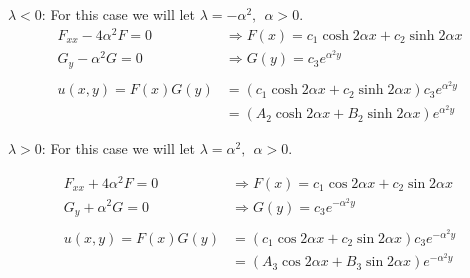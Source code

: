 \vspace{0.25cm}

\noindent\underline{$\lambda < 0$}: For this case we will let $\lambda = -\alpha^2, \ \ \alpha > 0$.
\begin{align*}
F_{xx} - 4 \alpha^2 F = 0 &\Rightarrow F(x) = c_1\cosh{2\alpha x} + c_2 \sinh{2\alpha x} \\
G_y - \alpha^2 G = 0 &\Rightarrow G(y) = c_3e^{\alpha^2 y} \\
& \\
u(x,y) = F(x)G(y) &= \left(c_1\cosh{2\alpha x} + c_2 \sinh{2\alpha x}\right) c_3e^{\alpha^2 y} \\
&= \left(A_2 \cosh{2 \alpha x} + B_2 \sinh{2 \alpha x}\right)e^{\alpha^2 y}
\end{align*}

\vspace{0.25cm}

\noindent\underline{$\lambda > 0$}: For this case we will let $\lambda = \alpha^2, \ \ \alpha > 0$.

\begin{align*}
F_{xx} + 4 \alpha^2 F = 0 &\Rightarrow F(x) = c_1 \cos{2\alpha x} + c_2 \sin{2\alpha x} \\
G_{y} + \alpha^2 G = 0 &\Rightarrow G(y) = c_3e^{-\alpha^2 y} \\
& \\
u(x,y) = F(x)G(y) &= \left(c_1 \cos{2\alpha x} + c_2 \sin{2\alpha x} \right)c_3e^{-\alpha^2 y}  \\
&= \left(A_3 \cos{2\alpha x} + B_3 \sin{2\alpha x} \right)e^{-\alpha^2 y}
\end{align*}

\vspace{0.5cm}

